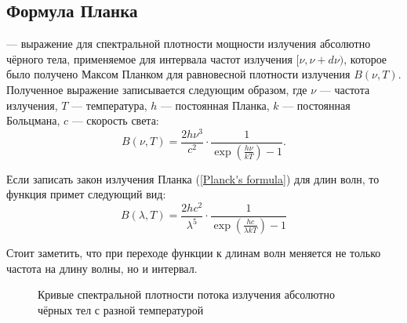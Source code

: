 \subsection{Формула Планка}
\label{sec:planck-law}
 --- выражение для спектральной плотности мощности излучения абсолютно чёрного тела, применяемое  для интервала частот излучения  $[\nu, \nu + d \nu)$, которое было получено Максом Планком для равновесной плотности излучения $B(\nu,T)$. Полученное выражение записывается следующим образом, где $\nu$ --- частота излучения, $T$ --- температура, $h$ --- постоянная Планка, $k$ --- постоянная Больцмана, $c$ --- скорость света:
\begin{equation}\label{Planck's formula}
B(\nu,T)=\frac{2h\nu^3}{c^2}\cdot \frac{1}{\exp\left(\frac{h\nu}{kT}\right)-1}.
\end{equation}

Если записать закон излучения Планка (\ref{Planck's formula}) для длин волн, то функция примет следующий вид:
\begin{equation}\label{Planck's formula2}
B(\lambda,T)=\frac{2hc^2}{\lambda^5} \cdot \frac{1}{\exp\left(\frac{hc}{\lambda kT}\right)-1}
\end{equation}

Стоит заметить, что при переходе функции к длинам волн меняется не только частота на длину волны, но и интервал. 

\begin{figure}[h!]
\begin{center}
\end{center}
\caption{Кривые спектральной плотности потока излучения абсолютно чёрных тел с разной температурой}\label{pic:wien-law}
\end{figure}

